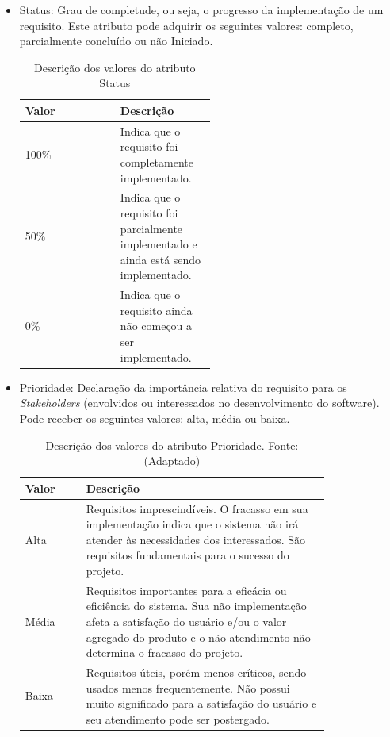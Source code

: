 \begin{itemize}
\item Status:
Grau de completude, ou seja, o progresso da implementação de um requisito. Este atributo pode adquirir os seguintes valores: completo, parcialmente concluído ou não Iniciado.

\begin{table}[h]
\centering
\caption{Descrição dos valores do atributo Status}
\label{Rotulo}
\begin{tabular}{ | l | p{0.5\linewidth} | }
\hline
\textbf{Valor} & \textbf{Descrição} \\ \hline
100\% &  Indica que o requisito foi completamente implementado. \\ \hline
50\% & Indica que o requisito foi parcialmente implementado e ainda está sendo implementado. \\ \hline
0\% & Indica que o requisito ainda não começou a ser implementado. \\ \hline
\end{tabular}
\end{table}


\item Prioridade:
Declaração da importância relativa do requisito para os \textit{Stakeholders} (envolvidos ou interessados no desenvolvimento do software). Pode receber os seguintes valores: alta, média ou baixa.

\begin{table}[h]
\centering
\caption{Descrição dos valores do atributo Prioridade. Fonte: \cite{atributos}(Adaptado)   }
\label{Rotulo}
\begin{tabular}{ | l | p{0.8\linewidth} | }
\hline
\textbf{Valor} & \textbf{Descrição} \\ \hline
Alta &  Requisitos imprescindíveis. O fracasso em sua implementação indica que o sistema não irá atender às necessidades dos interessados. São requisitos fundamentais para o sucesso do projeto. \\ \hline
Média & Requisitos importantes para a eficácia ou eficiência do sistema. Sua não implementação afeta a satisfação do usuário e/ou o valor agregado do produto e o não atendimento não determina o fracasso do projeto. \\ \hline
Baixa & Requisitos úteis, porém menos críticos, sendo usados menos frequentemente. Não possui muito significado para a satisfação do usuário e seu atendimento pode ser postergado. \\ \hline
\end{tabular}
\end{table}



\end{itemize}

